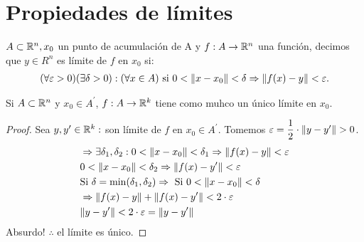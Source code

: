 \section{Propiedades de límites}

\begin{definition}[Límite]
  \(A \subset \mathbb{R}^n, x_0\) un punto de acumulación de A y \(f: A \to \mathbb{R}^n\) una función, decimos que \(y \in R^n\) es límite de \(f\) en \(x_0\) si: \begin{align*}
    (\forall \varepsilon > 0)(\exists \delta>0) : (\forall x \in A) \text{ si } 0 < \|x - x_0\| < \delta \Rightarrow \|f(x) - y\| < \varepsilon.
  \end{align*}
\end{definition}

\begin{lemma}
  Si \(A \subset \mathbb{R}^n\) y \(x_0 \in A^{\prime}\), \(f: A \to \mathbb{R}^k\) tiene como muhco un único límite en \(x_0\).
  \begin{proof}
    Sea \(y, y^{\prime} \in \mathbb{R}^k :\) son límite de \(f\) en \(x_0 \in A^{\prime}\). Tomemos \(\varepsilon = \dfrac{1}{2} \cdot \|y - y^{\prime}\| > 0\). \begin{align*}
       & \Rightarrow \exists \delta_1, \delta_2 : 0 < \| x - x_0 \| < \delta_1 \Rightarrow \|f(x) - y \| < \varepsilon \\
       & 0 < \|x - x_0\| < \delta_2 \Rightarrow \|f(x) - y^{\prime}\| < \varepsilon                                    \\
       & \text{Si } \delta = \min(\delta_1, \delta_2) \Rightarrow \text{ Si } 0 < \|x - x_0\| < \delta        \\
       & \Rightarrow \|f(x) - y\| + \|f(x) - y^{\prime}\| < 2 \cdot \varepsilon                                        \\
       & \|y - y^{\prime}\| < 2 \cdot \varepsilon = \|y - y^{\prime}\|
    \end{align*}
    Absurdo! \(\therefore\) el límite es único.
  \end{proof}
\end{lemma}

